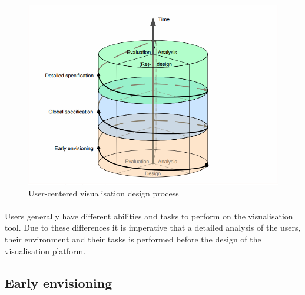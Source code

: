 \paragraph{}
\begin{figure}[b]
	\centering
	\includegraphics[width=0.7\linewidth]{img1}
	\caption{User-centered visualisation design process\cite{Abras04user-centereddesign}}
	\label{fig:img1}
\end{figure}

\paragraph{}
Users generally have different abilities and tasks to perform on the visualisation tool. Due to these differences it is imperative that a detailed analysis of the users, their environment and their tasks is performed before the design of the visualisation platform.

\subsection{Early envisioning}
